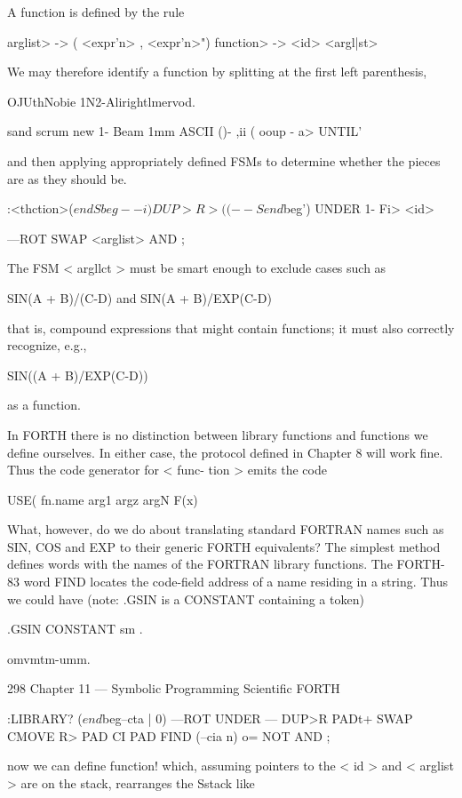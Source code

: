 A function is defined by the rule

\<arglist> -> ( <expr'n> {, <expr'n>}")
\<function> -> <id> <argl|st>

We may therefore identify a function by splitting at the first left
parenthesis,

OJUthNobie 1N2-Alirightlmervod.

sand scrum new
1- Beam 1mm ASCII ()- ,ii (
ooup - a> UNTIL'

and then applying appropriately defined FSMs to determine
whether the pieces are as they should be.

:<thction>($endSbeg--i)
DUP>R >( (--Send$beg')
UNDER 1- Fi> <id>

—ROT SWAP <arglist> AND ;

The FSM < argllct > must be smart enough to exclude cases such
as

SIN(A + B)/(C-D)
and
SIN(A + B)/EXP(C-D)

that is, compound expressions that might contain functions; it
must also correctly recognize, e.g.,

SIN((A + B)/EXP(C-D))

as a function.

In FORTH there is no distinction between library functions and
functions we define ourselves. In either case, the protocol defined
in Chapter 8 will work fine. Thus the code generator for < func-
tion > emits the code

USE( fn.name arg1 argz argN F(x)

What, however, do we do about translating standard FORTRAN
names such as SIN, COS and EXP to their generic FORTH
equivalents? The simplest method defines words with the names
of the FORTRAN library functions. The FORTH-83 word FIND
locates the code-field address of a name residing in a string. Thus
we could have (note: .GSIN is a CONSTANT containing a token)

.GSIN CONSTANT sm \etc.

omvmtm-umm.

298 Chapter 11 — Symbolic Programming Scientific FORTH

:LIBRARY? ($end$beg--cta | 0)
—ROT UNDER — DUP>R
PADt+ SWAP CMOVE R> PAD CI \makes
PAD FIND (--cia n) o= NOT AND ;

now we can define function! which, assuming pointers to the
< id > and < arglist > are on the stack, rearranges the Sstack like

 

 

